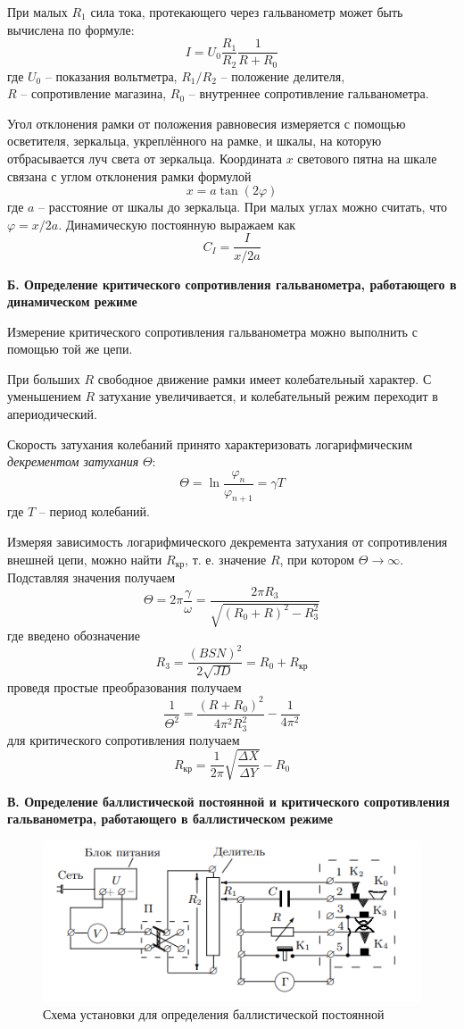 \documentclass[a4paper,12pt]{article}
\begin{document}
При малых $R_1$ сила тока, протекающего через гальванометр может быть вычислена по формуле:
\[I = U_0\frac{R_1}{R_2} \frac{1}{R + R_0}\]
где $U_0$ -- показания вольтметра, $R_1 / R_2$ -- положение делителя, \\ $R$ -- сопротивление магазина, $R_0$ -- внутреннее сопротивление гальванометра.

Угол отклонения рамки от положения равновесия измеряется с помощью осветителя, зеркальца, укреплённого на рамке, и шкалы, на которую отбрасывается луч света от зеркальца. Координата $x$ светового пятна на
шкале связана с углом отклонения рамки формулой
\[x = a \tan(2\varphi)\]
где $a$ -- расстояние от шкалы до зеркальца. При малых углах можно считать, что $\varphi = x/2a$. Динамическую постоянную выражаем как 
\[C_I = \frac{I}{x / 2a}\]

\textbf{Б. Определение критического сопротивления гальванометра, работающего в динамическом режиме}

Измерение критического сопротивления гальванометра можно выполнить с помощью той же цепи.

При больших $R$ свободное движение рамки имеет колебательный характер. С уменьшением $R$ затухание увеличивается, и колебательный режим переходит в апериодический.

Скорость затухания колебаний принято характеризовать логарифмическим \textit{декрементом затухания} $\Theta$:
\[\Theta = \ln{\frac{\varphi_n}{\varphi_{n + 1}}} = \gamma T\]
где $T$ -- период колебаний.

Измеряя зависимость логарифмического декремента затухания от сопротивления внешней цепи, можно найти $R_{кр}$, т. е. значение $R$, при
котором $\Theta \rightarrow \infty$. Подставляя значения получаем
\[\Theta = 2\pi \frac{\gamma}{\omega} = \frac{2\pi R_3}{\sqrt{(R_0 + R)^2 - R_3^2}}\]
где введено обозначение 
\[R_3 = \frac{(B S N)^2}{2\sqrt{JD}} = R_0 + R_{кр}\]
проведя простые преобразования получаем
\begin{equation}\label{eq: Theta^-2(R + R))}
    \frac{1}{\Theta^2} = \frac{(R + R_0)^2 }{4\pi^2 R_3^2} - \frac{1}{4\pi^2}
\end{equation}
для критического сопротивления получаем 
\[R_{кр} = \frac{1}{2 \pi} \sqrt{\frac{\Delta X}{\Delta Y}} - R_0\]

\textbf{В. Определение баллистической постоянной и критического сопротивления гальванометра, работающего в баллистическом режиме}

\begin{figure}[H]\label{fig: ustanovkaBallistRejim}
    \centering
    \includegraphics[width = 0.8 \textwidth]{УстновкаБаллист.png}
    \caption{Схема установки для определения баллистической постоянной}
\end{figure}
\end{document}
